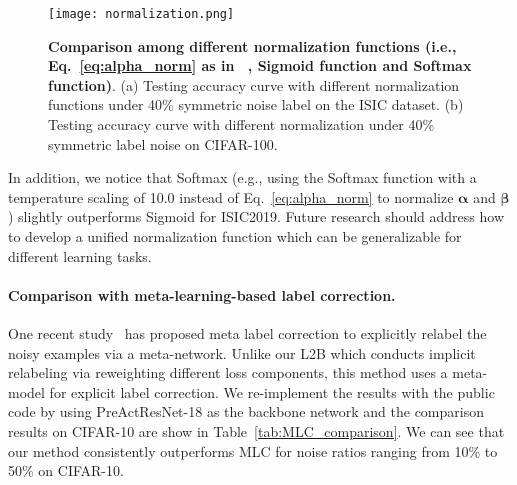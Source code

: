\documentclass{article}
\begin{document}
\begin{figure}[h]
\centering
        \texttt{[image: normalization.png]}
        \vspace{-3em}
        \caption{\textbf{Comparison among different normalization functions (i.e., Eq.~\eqref{eq:alpha_norm} as in ~\cite{ren2018learning}, Sigmoid function and Softmax function)}. (a) Testing accuracy curve with different normalization functions under 40\% symmetric noise label on the ISIC dataset. (b) Testing accuracy curve with different normalization under 40\% symmetric label noise on CIFAR-100.}
        \label{fig:normalization_comparison}
\end{figure}


In addition, we notice that Softmax (e.g., using the Softmax function with a temperature scaling of 10.0 instead of Eq.~\eqref{eq:alpha_norm} to normalize $\boldsymbol{\alpha}$ and $\boldsymbol{\beta}$) slightly outperforms Sigmoid for ISIC2019. Future research should address how to develop a unified normalization function which can be generalizable for different learning tasks.


\paragraph{Comparison with meta-learning-based label correction.}
One recent study~\cite{zheng2021meta} has proposed meta label correction to explicitly relabel the noisy examples via a meta-network. Unlike our L2B which conducts implicit relabeling via reweighting different loss components, this method uses a meta-model for explicit label correction. We re-implement the results with the public code by using PreActResNet-18 as the backbone network
and the comparison results on CIFAR-10 are show in Table~\ref{tab:MLC_comparison}. 
We can see that our method consistently outperforms MLC for noise ratios ranging from 10\% to 50\% on CIFAR-10.

\begin{table}[h!]
\footnotesize
\centering
\caption{Comparison with MLC ~\cite{zheng2021meta} in test accuracy (\%) on CIFAR-10 with symmetric noise.}
\vspace{-1em}
\label{tab:MLC_comparison}
\vspace{-1em}
\end{table} 
\end{document}
